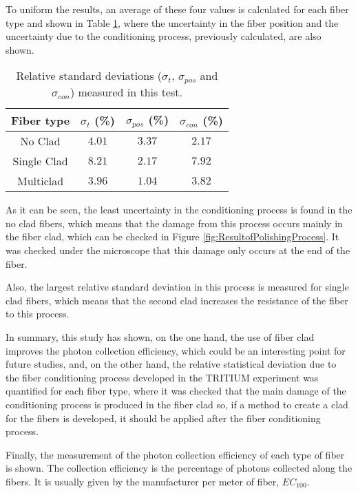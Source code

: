 To uniform the results, an average of these four values is calculated for each fiber type and shown in Table \ref{tab:RelativeStandardDeviations}, where the uncertainty in the fiber position and the uncertainty due to the conditioning process, previously calculated, are also shown. 

\begin{table}[htbp]
\begin{center}
\begin{tabular}{|c|c|c|c|}
\hline
Fiber type & $\sigma_t$ (\%) & $\sigma_{pos}$ (\%) & $\sigma_{con}$ (\%)\\\hline \hline \hline
No Clad & $4.01$ & $3.37$ & $2.17$ \\ \hline
Single Clad & $8.21$ & $2.17$ & $7.92$ \\ \hline
Multiclad & $3.96$ & $1.04$ & $3.82$ \\ \hline
\end{tabular}
\caption{Relative standard deviations ($\sigma_t$, $\sigma_{pos}$ and $\sigma_{con}$) measured in this test.}
\label{tab:RelativeStandardDeviations}
\end{center}
\end{table}

As it can be seen, the least uncertainty in the conditioning process is found in the no clad fibers, which means that the damage from this process occurs mainly in the fiber clad, which can be checked in Figure \ref{fig:ResultofPolishingProcess}. It was checked under the microscope that this damage only occurs at the end of the fiber.

Also, the largest relative standard deviation in this process is measured for single clad fibers, which means that the second clad increases the resistance of the fiber to this process.

In summary, this study has shown, on the one hand, the use of fiber clad improves the photon collection efficiency, which could be an interesting point for future studies, and, on the other hand, the relative statistical deviation due to the fiber conditioning process developed in the TRITIUM experiment was quantified for each fiber type, where it was checked that the main damage of the conditioning process is produced in the fiber clad so, if a method to create a clad for the fibers is developed, it should be applied after the fiber conditioning process.

Finally, the measurement of the photon collection efficiency of each type of fiber is shown. The collection efficiency is the percentage of photons collected along the fibers. It is usually given by the manufacturer per meter of fiber, $EC_ {100}$.

